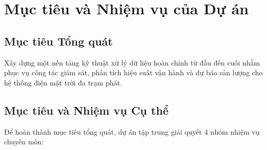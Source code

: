 \documentclass[12pt, a4paper]{report}
\begin{document}
\section{Mục tiêu và Nhiệm vụ của Dự án}
\label{sec:muctieu_nhiemvu}

\subsection{Mục tiêu Tổng quát}
Xây dựng một nền tảng kỹ thuật xử lý dữ liệu hoàn chỉnh từ đầu đến cuối nhằm phục vụ công tác giám sát, phân tích hiệu suất vận hành và dự báo sản lượng cho hệ thống điện mặt trời đa trạm phát.

\subsection{Mục tiêu và Nhiệm vụ Cụ thể}
Để hoàn thành mục tiêu tổng quát, dự án tập trung giải quyết 4 nhóm nhiệm vụ chuyên môn:
\end{document}
